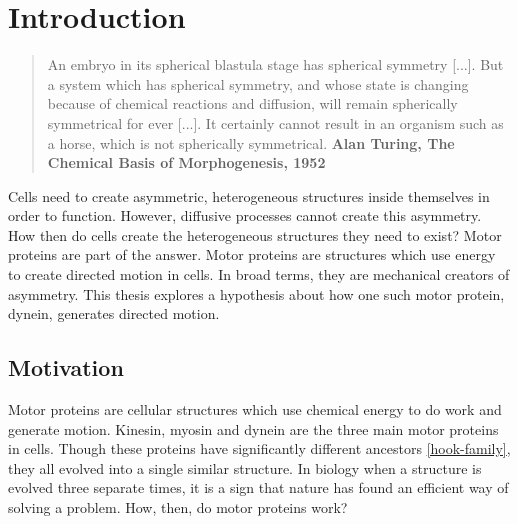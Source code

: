 \documentclass[
11pt, %
english, %
singlespacing, %
headsepline, %
chapterinoneline, %
]{MastersDoctoralThesis} %
\begin{document}


\mainmatter %

\pagestyle{thesis} %


\chapter{Introduction}
\label{chap:Introduction}

\blockquote{An embryo in its spherical blastula stage has spherical symmetry [...]. But a system which has spherical symmetry, and whose state is changing because of chemical reactions and diffusion, will remain spherically symmetrical for ever [...]. It certainly cannot result in an organism such as a horse, which is not spherically symmetrical. \textbf{Alan Turing, The Chemical Basis of Morphogenesis, 1952}}

Cells need to create asymmetric, heterogeneous structures inside themselves in order to function. However, diffusive processes cannot create this asymmetry. How then do cells create the heterogeneous structures they need to exist? Motor proteins are part of the answer. Motor proteins are structures which use energy to create directed motion in cells. In broad terms, they are mechanical creators of asymmetry. This thesis explores a hypothesis about how one such motor protein, dynein, generates directed motion.\\

\section{Motivation}
Motor proteins are cellular structures which use chemical energy to do work and generate motion. Kinesin, myosin and dynein are the three main motor proteins in cells. Though these proteins have significantly different ancestors \ref{hook-family}, they all evolved into a single similar structure. In biology when a structure is evolved three separate times, it is a sign that nature has found an efficient way of solving a problem. How, then, do motor proteins work?\\
\end{document}
